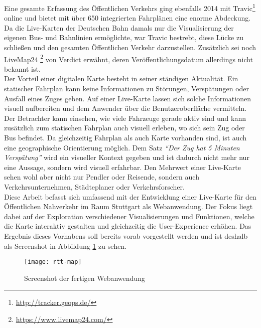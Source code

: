     Eine gesamte Erfassung des Öffentlichen Verkehrs ging ebenfalls 2014 mit Travic\footnote{\url{http://tracker.geops.de/}}\label{travic} online und bietet mit über 650 integrierten Fahrplänen eine enorme Abdeckung. Da die Live-Karten der Deutschen Bahn damals nur die Visualisierung der eigenen Bus- und Bahnlinien ermöglichte, war Travic bestrebt, diese Lücke zu schließen und den gesamten Öffentlichen Verkehr darzustellen. 
    Zusätzlich sei noch LiveMap24 \footnote{\url{https://www.livemap24.com/}} von Verdict erwähnt, deren Veröffentlichungsdatum allerdings nicht bekannt ist.\\

    Der Vorteil einer digitalen Karte besteht in seiner ständigen Aktualität. Ein statischer Fahrplan kann keine Informationen zu Störungen, Verspätungen oder Ausfall eines Zuges geben. Auf einer Live-Karte lassen sich solche Informationen visuell aufbereiten und dem Anwender über die Benutzeroberfläche vermitteln. Der Betrachter kann einsehen, wie viele Fahrzeuge gerade aktiv sind und kann zusätzlich zum statischen Fahrplan auch visuell erleben, wo sich sein Zug oder Bus befindet. 
    Da gleichzeitig Fahrplan als auch Karte vorhanden sind, ist auch eine geographische Orientierung möglich. Dem Satz \emph{"`Der Zug hat 5 Minuten Verspätung"'} wird ein visueller Kontext gegeben und ist dadurch nicht mehr nur eine Aussage, sondern wird visuell erfahrbar.
    Den Mehrwert einer Live-Karte sehen wohl aber nicht nur Pendler oder Reisende, sondern auch Verkehrsunternehmen, Städteplaner oder Verkehrsforscher.\\

    Diese Arbeit befasst sich umfassend mit der Entwicklung einer Live-Karte für den Öffentlichen Nahverkehr im Raum Stuttgart als Webanwendung. Der Fokus liegt dabei auf der Exploration verschiedener Visualisierungen und Funktionen, welche die Karte interaktiv gestalten und gleichzeitig die User-Experience erhöhen. Das Ergebnis dieses Vorhabens soll bereits vorab vorgestellt werden und ist deshalb als Screenshot in Abbildung \ref{fig:rtt-map} zu sehen.

    \begin{figure}[htbp]
        \begin{center}
            \texttt{[image: rtt-map]}
            \caption{Screenshot der fertigen Webanwendung}
            \label{fig:rtt-map}
        \end{center}
    \end{figure}
    
